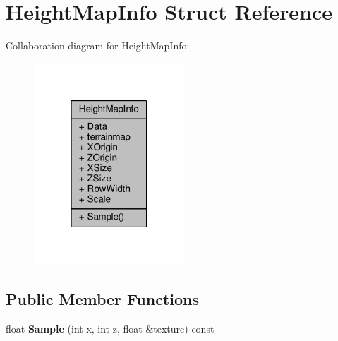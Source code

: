 \hypertarget{structHeightMapInfo}{}\section{Height\+Map\+Info Struct Reference}
\label{structHeightMapInfo}


Collaboration diagram for Height\+Map\+Info\+:
\nopagebreak
\begin{figure}[H]
\begin{center}
\leavevmode
\includegraphics[width=160pt]{dc/d08/structHeightMapInfo__coll__graph}
\end{center}
\end{figure}
\subsection*{Public Member Functions}
\begin{DoxyCompactItemize}
\item 
float {\bfseries Sample} (int x, int z, float \&texture) const \hypertarget{structHeightMapInfo_aaaed1290de6254a6e680e86bda671ae3}{}\label{structHeightMapInfo_aaaed1290de6254a6e680e86bda671ae3}

\end{DoxyCompactItemize}
